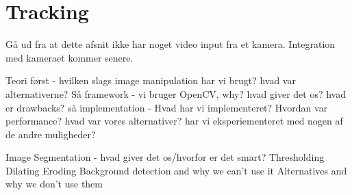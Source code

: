 
\section{Tracking}

Gå ud fra at dette afsnit ikke har noget video input fra et kamera. Integration med kameraet kommer senere.

Teori først - hvilken slags image manipulation har vi brugt? hvad var alternativerne?
Så framework - vi bruger OpenCV, why? hvad giver det os? hvad er drawbacks?
så implementation - Hvad har vi implementeret? Hvordan var performance? hvad var vores alternativer? har vi eksperiementeret med nogen af de andre muligheder?

Image Segmentation - hvad giver det os/hvorfor er det smart?
Thresholding
Dilating
Eroding
Background detection and why we can't use it
Alternatives and why we don't use them



